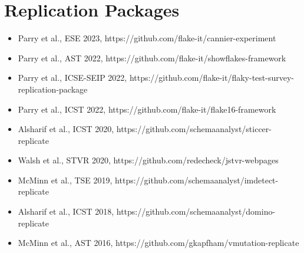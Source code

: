 \documentclass[11pt,letterpaper,sans]{moderncv}
\begin{document}






%
\vspace*{-.2in}
%
\section{Replication Packages}

\begin{itemize} \renewcommand\labelitemi{\Large\textbullet}

  \setlength\itemsep{0.5em}

  \item Parry et al., ESE 2023, https://github.com/flake-it/cannier-experiment

  \item Parry et al., AST 2022, https://github.com/flake-it/showflakes-framework

  \item Parry et al., ICSE-SEIP 2022, https://github.com/flake-it/flaky-test-survey-replication-package

  \item Parry et al., ICST 2022, https://github.com/flake-it/flake16-framework

  \item Alsharif et al., ICST 2020, https://github.com/schemaanalyst/sticcer-replicate

  \item Walsh et al., STVR 2020, https://github.com/redecheck/jstvr-webpages

  \item McMinn et al., TSE 2019, https://github.com/schemaanalyst/imdetect-replicate

  \item Alsharif et al., ICST 2018, https://github.com/schemaanalyst/domino-replicate

  \item McMinn et al., AST 2016, https://github.com/gkapfham/vmutation-replicate

\end{itemize}
\end{document}
